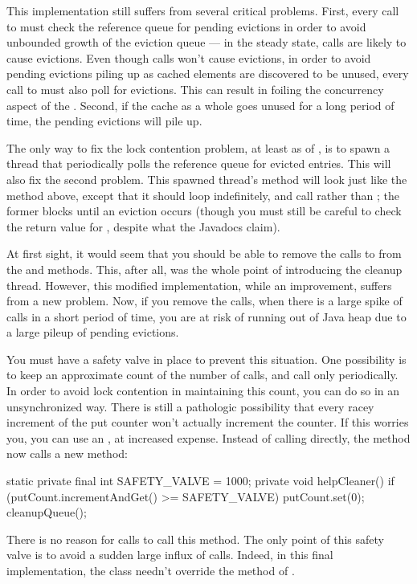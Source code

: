 This implementation still suffers from several critical problems. First, every
call to  must check the reference queue for pending evictions in order
to avoid unbounded growth of the eviction queue --- in the steady state,
 calls are likely to cause evictions. Even though  calls
won't cause evictions, in order to avoid pending evictions piling up as cached
elements are discovered to be unused, every call to  must also poll for
evictions. This can result in foiling the concurrency aspect of the
. Second, if the cache as a whole goes unused for a long
period of time, the pending evictions will pile up.

The only way to fix the lock contention problem, at least as of \javasix, is to
spawn a thread that periodically polls the reference queue for evicted entries.
This will also fix the second problem. This spawned thread's  method
will look just like the  method above, except that it should
loop indefinitely, and call  rather than ;
the former blocks until an eviction occurs (though you must still be careful to
check the return value for , despite what the Javadocs claim).

At first sight, it would seem that you should be able to remove the calls to
 from the  and  methods. This, after all,
was the whole point of introducing the cleanup thread. However, this modified
implementation, while an improvement, suffers from a new problem. Now, if you
remove the  calls, when there is a large spike of 
calls in a short period of time, you are at risk of running out of Java heap due
to a large pileup of pending evictions.

You must have a safety valve in place to prevent this situation. One possibility
is to keep an approximate count of the number of  calls, and call
 only periodically. In order to avoid lock contention in
maintaining this count, you can do so in an unsynchronized way. There is still a
pathologic possibility that every racey increment of the put counter won't
actually increment the counter. If this worries you, you can use an
, at increased expense. Instead of calling
 directly, the  method now calls a new
 method:
\begin{shortlisting}
   static private final int SAFETY_VALVE = 1000;
   private void helpCleaner() {
      if (putCount.incrementAndGet() >= SAFETY_VALVE) {
         putCount.set(0);
         cleanupQueue();
      }
   }
\end{shortlisting}
There is no reason for  calls to call this method. The only point of
this safety valve is to avoid a sudden large influx of  calls. Indeed,
in this final implementation, the  class needn't override
the  method of .



